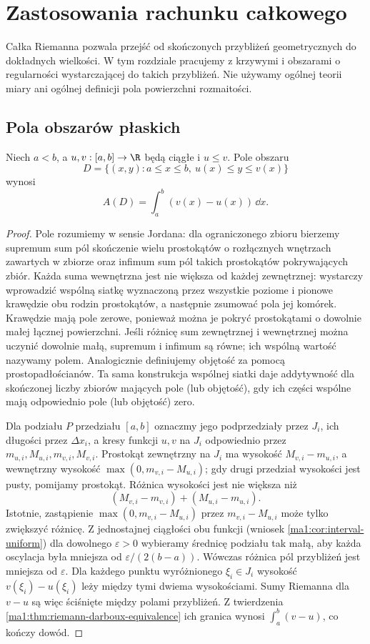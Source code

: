 \chapter{Zastosowania rachunku całkowego}
\label{ma1:ch:integral-applications}

Całka Riemanna pozwala przejść od skończonych przybliżeń geometrycznych do dokładnych wielkości. W tym rozdziale pracujemy z krzywymi i obszarami o regularności wystarczającej do takich przybliżeń. Nie używamy ogólnej teorii miary ani ogólnej definicji pola powierzchni rozmaitości.

\section{Pola obszarów płaskich}
\begin{twierdzenie}
\label{ma1:thm:area-between-graphs}
Niech $a<b$, a $u,v:[a,b]\to\R$ będą ciągłe i $u\le v$. Pole obszaru
\[
 D=\{(x,y):a\le x\le b,\ u(x)\le y\le v(x)\}
\]
wynosi
\[
 A(D)=\int_a^b(v(x)-u(x))\,\dd x.
\]
\end{twierdzenie}
\begin{proof}
Pole rozumiemy w sensie Jordana: dla ograniczonego zbioru bierzemy supremum sum pól skończenie wielu prostokątów o rozłącznych wnętrzach zawartych w zbiorze oraz infimum sum pól takich prostokątów pokrywających zbiór. Każda suma wewnętrzna jest nie większa od każdej zewnętrznej: wystarczy wprowadzić wspólną siatkę wyznaczoną przez wszystkie poziome i pionowe krawędzie obu rodzin prostokątów, a następnie zsumować pola jej komórek. Krawędzie mają pole zerowe, ponieważ można je pokryć prostokątami o dowolnie małej łącznej powierzchni. Jeśli różnicę sum zewnętrznej i wewnętrznej można uczynić dowolnie małą, supremum i infimum są równe; ich wspólną wartość nazywamy polem. Analogicznie definiujemy objętość za pomocą prostopadłościanów. Ta sama konstrukcja wspólnej siatki daje addytywność dla skończonej liczby zbiorów mających pole (lub objętość), gdy ich części wspólne mają odpowiednio pole (lub objętość) zero.

Dla podziału $P$ przedziału $[a,b]$ oznaczmy jego podprzedziały przez $J_i$, ich długości przez $\Delta x_i$, a kresy funkcji $u,v$ na $J_i$ odpowiednio przez $m_{u,i},M_{u,i},m_{v,i},M_{v,i}$. Prostokąt zewnętrzny na $J_i$ ma wysokość $M_{v,i}-m_{u,i}$, a wewnętrzny wysokość $\max(0,m_{v,i}-M_{u,i})$; gdy drugi przedział wysokości jest pusty, pomijamy prostokąt. Różnica wysokości jest nie większa niż
\[
 (M_{v,i}-m_{v,i})+(M_{u,i}-m_{u,i}).
\]
Istotnie, zastąpienie $\max(0,m_{v,i}-M_{u,i})$ przez $m_{v,i}-M_{u,i}$ może tylko zwiększyć różnicę. Z jednostajnej ciągłości obu funkcji (wniosek \ref{ma1:cor:interval-uniform}) dla dowolnego $\varepsilon>0$ wybieramy średnicę podziału tak małą, aby każda oscylacja była mniejsza od $\varepsilon/(2(b-a))$. Wówczas różnica pól przybliżeń jest mniejsza od $\varepsilon$.
Dla każdego punktu wyróżnionego $\xi_i\in J_i$ wysokość $v(\xi_i)-u(\xi_i)$ leży między tymi dwiema wysokościami. Sumy Riemanna dla $v-u$ są więc ściśnięte między polami przybliżeń. Z twierdzenia \ref{ma1:thm:riemann-darboux-equivalence} ich granica wynosi $\int_a^b(v-u)$, co kończy dowód.
\end{proof}
